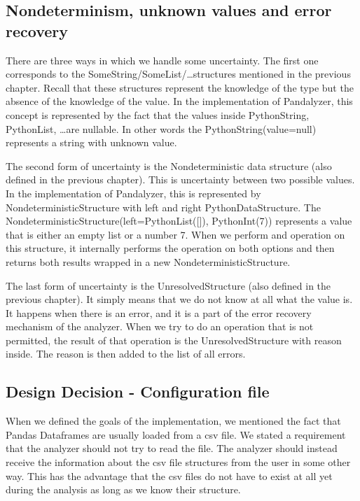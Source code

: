 \subsection{Nondeterminism, unknown values and error recovery}

There are three ways in which we handle some uncertainty.
The first one corresponds to the SomeString/SomeList/\ldots structures mentioned in the previous chapter.
Recall that these structures represent the knowledge of the type but the absence of the knowledge of the value.
In the implementation of Pandalyzer, this concept is represented by the fact that the values inside PythonString,
PythonList, \ldots are nullable.
In other words the PythonString(value=null) represents a string with unknown value.

The second form of uncertainty is the Nondeterministic data structure (also defined in the previous chapter).
This is uncertainty between two possible values.
In the implementation of Pandalyzer, this is represented by NondeterministicStructure with left and right
PythonDataStructure.
The NondeterministicStructure(left=PythonList([]), PythonInt(7)) represents a value that is either an empty list or a
number 7.
When we perform and operation on this structure, it internally performs the operation on both options and then
returns both results wrapped in a new NondeterministicStructure.

The last form of uncertainty is the UnresolvedStructure (also defined in the previous chapter).
It simply means that we do not know at all what the value is.
It happens when there is an error, and it is a part of the error recovery mechanism of the analyzer.
When we try to do an operation that is not permitted, the result of that operation is the UnresolvedStructure with
reason inside.
The reason is then added to the list of all errors.




\subsection{Design Decision - Configuration file}

When we defined the goals of the implementation, we mentioned the fact that Pandas Dataframes are usually loaded
from a csv file.
We stated a requirement that the analyzer should not try to read the file.
The analyzer should instead receive the information about the csv file structures from the user in some other way.
This has the advantage that the csv files do not have to exist at all yet during the analysis as long as we know their
structure.

